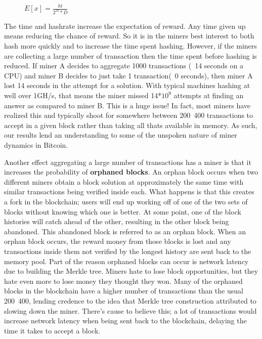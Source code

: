\documentclass[pdftex,11pt]{article}
\begin{document}
\begin{figure}[H]
	\centering
 	$E[x] = \frac{ht}{2^{32}*D}$
 \end{figure}

The time and hashrate increase the expectation of reward. Any time given up means reducing the chance of reward. So it is in the miners best interest to both hash more quickly and to increase the time spent hashing. However, if the miners are collecting a large number of transaction then the time spent before hashing is reduced. If miner A decides to aggregate 1000 transactions (~14 seconds on a CPU) and miner B decides to just take 1 transaction(~0 seconds), then miner A lost 14 seconds in the attempt for a solution. With typical machines hashing at well over 1GH/s, that means the miner missed 14*$10^{9}$ attempts at finding an answer as compared to miner B. This is a huge issue! In fact, most miners have realized this and typically shoot for somewhere between 200~400 transactions to accept in a given block rather than taking all thats available in memory. As such, our results lend an understanding to some of the unspoken nature of miner dynamics in Bitcoin.

Another effect aggregating a large number of transactions has a miner is that it increases the probability of {\bf orphaned blocks}. An orphan block occurs when two different miners obtain a block solution at approximately the same time with similar transactions being verified inside each. What happens is that this creates a fork in the blockchain; users will end up working off of one of the two sets of blocks without knowing which one is better. At some point, one of the block histories will catch ahead of the other, resulting in the other block being abandoned. This abandoned block is referred to as an orphan block. When an orphan block occurs, the reward money from those blocks is lost and any transactions inside them not verified by the longest history are sent back to the memory pool. Part of the reason orphaned blocks can occur is network latency due to building the Merkle tree. Miners hate to lose block opportunities, but they hate even more to lose money they thought they won. Many of the orphaned blocks in the blockchain have a higher number of transactions than the usual 200~400, lending credence to the idea that Merkle tree construction attributed to slowing down the miner. There's cause to believe this; a lot of transactions would increase network latency when being sent back to the blockchain, delaying the time it takes to accept a block.
\end{document}
